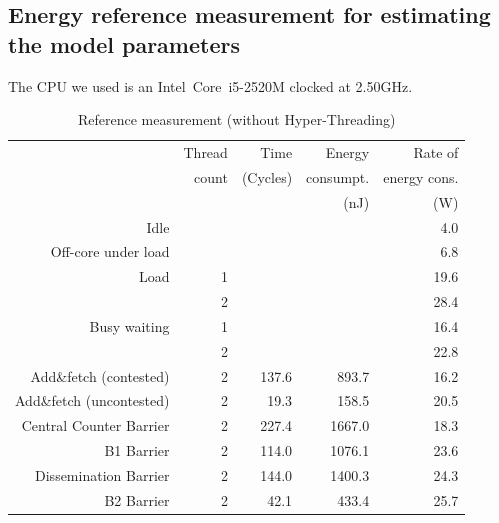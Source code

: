 \documentclass[a4paper, 10pt]{article}
\begin{document}
\subsection{Energy reference measurement for estimating the model parameters}
The CPU we used is an Intel\textregistered~Core\texttrademark~i5-2520M clocked at 2.50GHz.
\label{ssec:energy-measurement}
\begin{table}[htbp]
	\centering
	\caption{Reference measurement (without Hyper-Threading)}
	\vspace{0.2cm}
	\begin{tabular}{r | r | r r r}
		                         & Thread & Time     & Energy    & Rate of      \\
		                         & count  & (Cycles) & consumpt. & energy cons. \\
		                         &        &          & (nJ)      & (W)          \\
		\hline
		Idle                     &        &          &           &  4.0 \\
		Off-core under load      &        &          &           &  6.8 \\
		Load                     & 1      &          &           & 19.6 \\
		                         & 2      &          &           & 28.4 \\
		Busy waiting             & 1      &          &           & 16.4 \\
		                         & 2      &          &           & 22.8 \\
		\hline
		Add\&fetch (contested)   & 2      &    137.6 &     893.7 & 16.2 \\
		Add\&fetch (uncontested) & 2      &     19.3 &     158.5 & 20.5 \\
		Central Counter Barrier  & 2      &    227.4 &    1667.0 & 18.3 \\
		B1 Barrier               & 2      &    114.0 &    1076.1 & 23.6 \\
		Dissemination Barrier    & 2      &    144.0 &    1400.3 & 24.3 \\
		B2 Barrier               & 2      &     42.1 &     433.4 & 25.7 \\
	\end{tabular}
\end{table}
\end{document}
